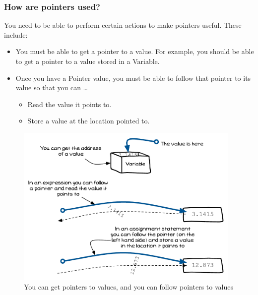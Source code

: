 
\clearpage
\subsubsection{How are pointers used?} %
\label{ssub:how_are_pointers_used_}

You need to be able to perform certain actions to make pointers useful. These include:

\begin{itemize}
  \item You must be able to get a pointer to a value. For example, you should be able to get a pointer to a value stored in a Variable.
  \item Once you have a Pointer value, you must be able to follow that pointer to its value so that you can \ldots
  \begin{itemize}
    \item Read the value it points to.
    \item Store a value at the location pointed to.
  \end{itemize}
\end{itemize}

\begin{figure}[h]
   \centering
   \includegraphics[width=0.97\textwidth]{./topics/dynamic-memory/diagrams/PointerActions} 
   \caption{You can get pointers to values, and you can follow pointers to values}
   \label{fig:pointer-actions}
\end{figure}

